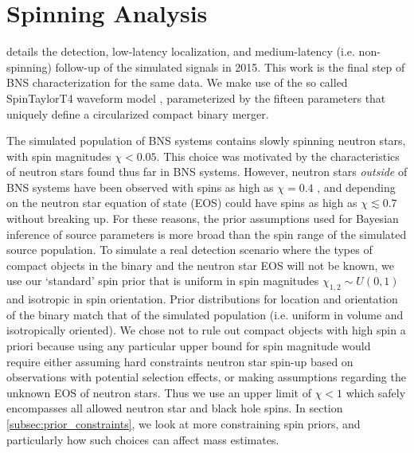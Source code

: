 \section{Spinning Analysis}
\label{sec:spin}

\citet{Singer_2014} details the detection, low-latency localization, and medium-latency (i.e. non-spinning) follow-up of the simulated signals in 2015. This work is the final step of BNS characterization for the same data. We make use of the so called SpinTaylorT4 waveform model \citep{Buonanno_2003,Buonanno_2009}, parameterized by the fifteen parameters that uniquely define a circularized compact binary merger.

The simulated population of BNS systems contains slowly spinning neutron stars, with spin magnitudes $\chi < 0.05$.  This choice was motivated by the characteristics of neutron stars found thus far in BNS systems. However, neutron stars \emph{outside} of BNS systems have been observed with spins as high as $\chi = 0.4$ \citep{Hessels_2006,Brown_2012}, and depending on the neutron star equation of state (EOS) could have spins as high as $\chi \lesssim 0.7$ \citep{Lo_2011} without breaking up.  For these reasons, the prior assumptions used for Bayesian inference of source parameters is more broad than the spin range of the simulated source population.  To simulate a real detection scenario where the types of compact objects in the binary and the neutron star EOS will not be known, we use our `standard' spin prior that is uniform in spin magnitudes $\chi_{1,2} \sim U(0, 1)$ and isotropic in spin orientation. Prior distributions for location and orientation of the binary match that of the simulated population (i.e. uniform in volume and isotropically oriented).  We chose not to rule out compact objects with high spin a priori because using any particular upper bound for spin magnitude would require either assuming hard constraints neutron star spin-up based on observations with potential selection effects, or making assumptions regarding the unknown EOS of neutron stars. Thus we use an upper limit of $\chi < 1$ which safely encompasses all allowed neutron star and black hole spins.  In section \ref{subsec:prior_constraints}, we look at more constraining spin priors, and particularly how such choices can affect mass estimates.